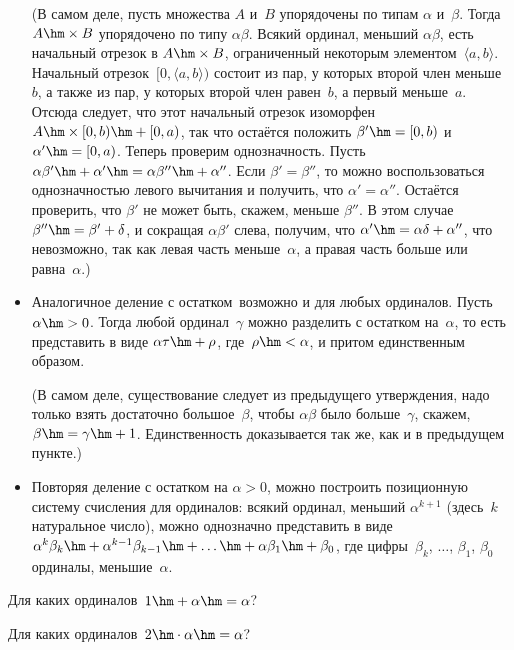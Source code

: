 \begin{itemize}
(В самом деле, пусть множества $A$
и~$B$ упорядочены по типам $\alpha$ и~$\beta$. Тогда $A\hm\times B$
упорядочено по типу $\alpha\beta$. Всякий ординал, меньший
$\alpha\beta$, есть начальный отрезок в $A\hm\times B$,
ограниченный некоторым элементом~$\langle a,b\rangle$.
Начальный отрезок~$[0,\langle a,b\rangle)$ состоит из пар, у
которых второй член меньше~$b$, а также из пар, у которых второй
член равен~$b$, а первый меньше~$a$. Отсюда следует, что этот
начальный отрезок изоморфен $A\hm\times[0,b)\hm+[0,a)$, так что
остаётся положить $\beta'\hm=[0,b)$ и $\alpha'\hm=[0,a)$. Теперь
проверим однозначность. Пусть
$\alpha\beta'\hm+\alpha'\hm=\alpha\beta''\hm+\alpha''$. Если
$\beta'=\beta''$, то можно воспользоваться однозначностью левого
вычитания и получить, что $\alpha'=\alpha''$. Остаётся
проверить, что $\beta'$ не может быть, скажем, меньше $\beta''$.
В этом случае $\beta''\hm=\beta'+\delta$, и сокращая $\alpha\beta'$
слева, получим, что $\alpha'\hm=\alpha\delta+\alpha''$, что
невозможно, так как левая часть меньше~$\alpha$, а правая часть
больше или равна~$\alpha$.)
\item Аналогичное  деление с остатком\ возможно и для
любых ординалов. Пусть~$\alpha\hm>0$. Тогда любой ординал~$\gamma$
можно разделить с остатком на~$\alpha$, то есть представить в
виде $\alpha\tau\hm+\rho$, где~$\rho\hm<\alpha$, и притом
единственным образом.

(В самом деле, существование следует из предыдущего утверждения,
надо только взять достаточно большое~$\beta$, чтобы $\alpha\beta$
было больше~$\gamma$, скажем, $\beta\hm=\gamma\hm+1$. Единственность
доказывается так же, как и в предыдущем пункте.)
\item
\label{position-ordinal-system}%
Повторяя деление с остатком на $\alpha>0$, можно построить
позиционную систему счисления для
ординалов: всякий ординал,
меньший $\alpha^{k+1}$ (здесь~$k$\т натуральное число), можно
однозначно представить в виде
$\alpha^k\beta_k\hm+\alpha^{k-1}\beta_{k-1}\hm+
\ldots\hm+\alpha\beta_1\hm+\beta_0$, где  цифры\
$\beta_k$, $\dots$, $\beta_1$, $\beta_0$\т ординалы, меньшие~$\alpha$.

\end{itemize}

\begin{problem}
Для каких ординалов~$1\hm+\alpha\hm=\alpha$?
\end{problem}

\begin{problem}
Для каких ординалов~$2\hm\cdot\alpha\hm=\alpha$?
\end{problem}

